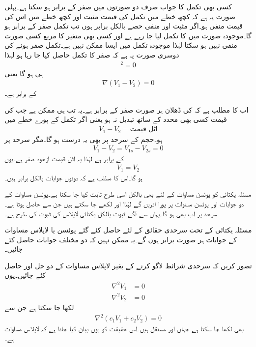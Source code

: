کسی بھی تکمل کا جواب صرف دو صورتوں میں صفر کے برابر ہو سکتا ہے۔پہلی صورت یہ ہے کہ کچھ خطے میں تکمل کی قیمت مثبت اور کچھ خطے میں اس کی قیمت منفی ہو۔اگر مثبت اور منفی حصے بالکل برابر ہوں تب تکمل صفر کے برابر ہو گا۔موجودہ صورت میں  کا تکمل لیا جا رہے ہے اور کسی بھی متغیر کا مربع کسی صورت منفی نہیں ہو سکتا لہٰذا موجودہ تکمل میں ایسا ممکن نہیں ہے۔تکمل صفر ہونے کی دوسری صورت یہ ہے کہ صفر کا تکمل حاصل کیا جا رہا ہو لہٰذا
\begin{align*}
[\nabla(V_1-V_2)]^2 =0
\end{align*}
ہی ہو گا یعنی
\begin{align*}
\nabla (V_1-V_2)=0
\end{align*}
کے برابر ہے۔

اب  کا مطلب ہے کہ  کی ڈھلان ہر صورت صفر کے برابر ہے۔یہ تب ہی ممکن ہے جب  کی قیمت کسی بھی محدد کے ساتھ تبدیل نہ ہو یعنی اگر تکمل کے پورے خطے میں
\begin{align*}
V_1-V_2=\textrm{اٹل قیمت}
\end{align*}
ہو۔حجم کے سرحد پر بھی یہ درست ہو گا۔مگر سرحد پر
\begin{align*}
V_1-V_2=V_{1s}-V_{2s}=0
\end{align*}
کے برابر ہے لہٰذا یہ اٹل قیمت ازخود صفر ہے۔یوں
\begin{align}
V_1=V_2
\end{align}
ہو گا۔اس کا مطلب  ہے کہ دونوں جوابات بالکل برابر ہیں۔

مسئلہ یکتائی کو پوئسن مساوات کے لئے بھی بالکل اسی طرح ثابت کیا جا سکتا ہے۔پوئسن مساوات کے دو جوابات  اور  پوئسن مساوات پر پورا اتریں گے لہٰذا  اور  لکھے جا سکتے ہیں جن سے  حاصل ہوتا ہے۔سرحد پر اب بھی  ہو گا۔یہاں سے آگے ثبوت بالکل یکتائی لاپلاس کی ثبوت کی طرح ہے۔

مسئلہ یکتائی کے تحت سرحدی حقائق کے لئے حاصل کئے  گئے پوئسن یا لاپلاس مساوات کے جوابات ہر صورت برابر ہوں گے۔یہ ممکن نہیں کہ دو مختلف جوابات حاصل کئے جائیں۔ 

تصور کریں کہ سرحدی شرائط لاگو کرنے  کے بغیر لاپلاس مساوات کے دو حل  اور  حاصل کئے جائیں۔یوں
\begin{align*}
\nabla^2 V_1&=0\\
\nabla^2 V_2&=0
\end{align*}
لکھا جا سکتا ہے جن سے
\begin{align*}
\nabla^2 (c_1 V_1 + c_2 V_2)=0 
\end{align*}
بھی لکھا جا سکتا ہے جہاں  اور  مستقل ہیں۔اس حقیقت کو یوں بیان کیا جاتا ہے کہ لاپلاس مساوات  ہے۔


